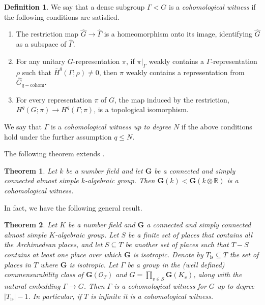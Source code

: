 \documentclass[12pt,reqno]{amsart}
\newtheorem{mainthm}{Theorem}
\theoremstyle{definition}
\newtheorem{definition}[theorem]{Definition}
\newcommand{\barH}{\bar{H}}
\begin{document}
\begin{definition}
    We say that a dense subgroup $\Gamma<G$ is a \emph{cohomological witness} if the following conditions are satisfied.
    \begin{enumerate}
       \item The restriction map $\widehat{G}\to \widehat{\Gamma}$ is a homeomorphism onto its image, identifying $\widehat{G}$ as a subspace of $\widehat{\Gamma}$.
       \item For any unitary $G$-representation $\pi$, if $\pi|_\Gamma$ weakly contains a $\Gamma$-representation $\rho$ such that $\barH^q(\Gamma;\rho) \ne 0$, then $\pi$ weakly contains a representation from $\widehat{G}_{q-\mathrm{cohom}}$.
       \item For every representation $\pi$ of $G$, the map induced by the restriction, $H^q(G;\pi) \to H^q(\Gamma;\pi)$, is a topological isomorphism.
    \end{enumerate}
    We say that $\Gamma$ is a \emph{cohomological witness up to degree $N$} if the above conditions hold under the further assumption $q\leq N$.
\end{definition}

The following theorem extends \cite[Theorem F]{BaderSauer}.

\begin{mainthm}\label{intro:witness-Lie}
  Let $k$ be a number field and let $\mathbf{G}$ be a
connected and simply connected almost simple $k$-algebraic group. 
Then $\mathbf{G}(k)<\mathbf{G}(k \otimes \mathbb{R})$ is a cohomological witness.
\end{mainthm}

In fact, we have the following general result.

\begin{mainthm}\label{intro:witness}
Let $K$ be a number field and $\mathbf{G}$ a
connected and simply connected almost simple $K$-algebraic group.
Let $S$ be a finite set of places that contains all the Archimedean places, and let $S \subseteq T$ be another set of places such that $T - S$ contains at least one place over which $\mathbf{G}$ is isotropic. Denote by $T_{\mathrm{is}} \subseteq T$ the set of places in $T$ where $\mathbf{G}$ is isotropic.  Let $\Gamma$ be a group in the (well defined) commensurability class of $\mathbf{G}(\mathcal{O}_T)$ and $G=\prod_{v \in S} \mathbf{G}(K_v)$, along with the natural embedding $\Gamma\to G$. Then $\Gamma$ is a cohomological witness for $G$ up to degree $|T_{\mathrm{is}}|-1$. In particular, if $T$ is infinite it is a cohomological witness.
\end{mainthm}
\end{document}
